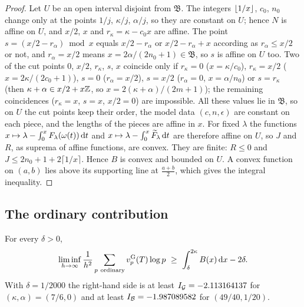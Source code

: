 \begin{proof}
Let $U$ be an open interval disjoint from $\mathfrak B$. The integers $\left\lfloor 1/x\right\rfloor$, $c_0$, $n_0$
change only at the points $1/j$, $\kappa/j$, $\alpha/j$, so they are constant on $U$; hence $N$ is
affine on $U$, and $x/2$, $x$ and $r_\kappa=\kappa-c_0x$ are affine. The point
$s=(x/2-r_\alpha)\bmod x$ equals $x/2-r_\alpha$ or $x/2-r_\alpha+x$ according as
$r_\alpha\le x/2$ or not, and $r_\alpha=x/2$ means $x=2\alpha/(2n_0+1)\in\mathfrak B$, so $s$ is
affine on $U$ too. Two of the cut points $0$, $x/2$, $r_\kappa$, $s$, $x$ coincide only if
$r_\kappa=0$ ($x=\kappa/c_0$), $r_\kappa=x/2$ ($x=2\kappa/(2c_0+1)$), $s=0$ ($r_\alpha=x/2$),
$s=x/2$ ($r_\alpha=0$, $x=\alpha/n_0$) or $s=r_\kappa$ (then $\kappa+\alpha\in x/2+x\mathbb{Z}$, so
$x=2(\kappa+\alpha)/(2m+1)$); the remaining coincidences ($r_\kappa=x$, $s=x$, $x/2=0$) are
impossible. All these values lie in $\mathfrak B$, so on $U$ the cut points keep their order, the
model data $(c,n,\epsilon)$ are constant on each piece, and the lengths of the pieces are affine
in $x$. For fixed $\lambda$ the functions $x\mapsto\lambda-\int_0^xF_\lambda(\omega(t))\,\mathrm{d} t$
and $x\mapsto\lambda-\int_0^x\widetilde F_\lambda\,\mathrm{d} t$ are therefore affine on $U$, so $J$ and $R$, as
suprema of affine functions, are convex. They are finite: $R\le0$ and
$J\le2n_0+1+2\lceil1/x\rceil$. Hence $B$ is convex and bounded on $U$. A convex function on $(a,b)$ lies above
its supporting line at $\frac{a+b}2$, which gives the integral inequality.
\end{proof}

\subsection{The ordinary contribution}\label{subsec:ordinary-contribution}

\begin{theorem}\label{thm:ordinary}
For every $\delta>0$,
\[
  \liminf_{h\to\infty}\frac1{h^2}\sum_{p\ \mathrm{ordinary}}\vG p(T)\log p\ \ge\
  \int_\delta^{2\kappa}B(x)\diff x-2\delta .
\]
With $\delta=1/2000$ the right-hand side is at least $I_{\mathcal{G}}=-2.113164137$ for
$(\kappa,\alpha)=(7/6,0)$ and at least $I_{\mathcal{B}}=-1.987089582$ for $(49/40,1/20)$.
\end{theorem}

